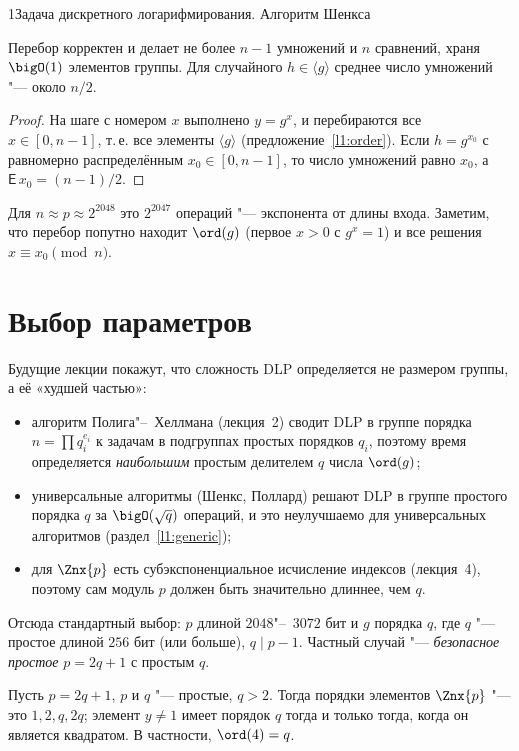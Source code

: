 \begin{lecture}{1}{Задача дискретного логарифмирования. Алгоритм Шенкса}
\begin{proposition}
Перебор корректен и делает не более $n - 1$ умножений и $n$ сравнений, храня $\bigO(1)$
элементов группы. Для случайного $h \in \langle g \rangle$ среднее число умножений "--- около
$n/2$.
\end{proposition}

\begin{proof}
На шаге с номером $x$ выполнено $y = g^x$, и перебираются все $x \in [0, n - 1]$, т.\,е. все
элементы $\langle g \rangle$ (предложение~\ref{l1:order}). Если $h = g^{x_0}$ с равномерно
распределённым $x_0 \in [0, n - 1]$, то число умножений равно $x_0$, а $\mathsf{E}\,x_0 =
(n - 1)/2$.
\end{proof}

Для $n \approx p \approx 2^{2048}$ это $2^{2047}$ операций "--- экспонента от длины входа.
Заметим, что перебор попутно находит $\ord(g)$ (первое $x > 0$ с $g^x = 1$) и все решения
$x \equiv x_0 \pmod n$.


\section{Выбор параметров}\label{l1:params}

Будущие лекции покажут, что сложность DLP определяется не размером группы, а её «худшей частью»:
\begin{itemize}
  \item алгоритм Полига"--~Хеллмана (лекция~2) сводит DLP в группе порядка $n =
    \prod q_i^{e_i}$ к задачам в подгруппах простых порядков $q_i$, поэтому время определяется
    \emph{наибольшим} простым делителем $q$ числа $\ord(g)$;
  \item универсальные алгоритмы (Шенкс, Поллард) решают DLP в группе простого порядка $q$ за
    $\bigO(\sqrt q)$ операций, и это неулучшаемо для универсальных алгоритмов (раздел~\ref{l1:generic});
  \item для $\Znx{p}$ есть субэкспоненциальное исчисление индексов (лекция~4), поэтому сам модуль
    $p$ должен быть значительно длиннее, чем $q$.
\end{itemize}
Отсюда стандартный выбор: $p$ длиной $2048$"--~$3072$ бит и $g$ порядка $q$, где $q$ "---
простое длиной $256$ бит (или больше), $q \mid p - 1$. Частный случай "--- \emph{безопасное
простое} $p = 2q + 1$ с простым $q$.

\begin{proposition}\label{l1:safe}
Пусть $p = 2q + 1$, $p$ и $q$ "--- простые, $q > 2$. Тогда порядки элементов $\Znx{p}$ "--- это
$1, 2, q, 2q$; элемент $y \ne 1$ имеет порядок $q$ тогда и только тогда, когда он является
квадратом. В частности, $\ord(4) = q$.
\end{proposition}


\end{lecture}
